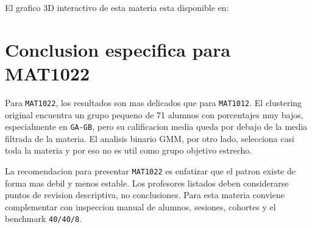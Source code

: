 \documentclass[11pt,letterpaper]{article}
\newcommand{\code}[1]{\texttt{#1}}
\begin{document}
El grafico 3D interactivo de esta materia esta disponible en:

\begin{center}
\parbox{0.9\textwidth}{\centering\footnotesize{}}
\end{center}

\section{Conclusion especifica para MAT1022}

Para \code{MAT1022}, los resultados son mas delicados que para \code{MAT1012}. El clustering original encuentra un grupo pequeno de 71 alumnos con porcentajes muy bajos, especialmente en \code{GA-GB}, pero su calificacion media queda por debajo de la media filtrada de la materia. El analisis binario GMM, por otro lado, selecciona casi toda la materia y por eso no es util como grupo objetivo estrecho.

La recomendacion para presentar \code{MAT1022} es enfatizar que el patron existe de forma mas debil y menos estable. Los profesores listados deben considerarse puntos de revision descriptiva, no conclusiones. Para esta materia conviene complementar con inspeccion manual de alumnos, sesiones, cohortes y el benchmark \code{40/40/8}.

\end{document}
